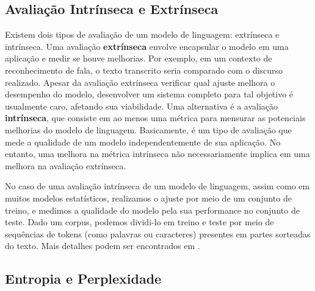\documentclass{automatextcc}
\begin{document}

\subsection{Avaliação Intrínseca e Extrínseca}
Existem dois tipos de avaliação de um modelo de linguagem: extrínseca e intrínseca. Uma avaliação \textbf{extrínseca} envolve encapsular o modelo em uma aplicação e medir se houve melhorias. Por exemplo, em um contexto de reconhecimento de fala, o texto transcrito seria comparado com o discurso realizado. Apesar da avaliação extrínseca verificar qual ajuste melhora o desempenho do modelo, desenvolver um sistema completo para tal objetivo é usualmente caro, afetando sua viabilidade. Uma alternativa é a avaliação \textbf{intrínseca}, que consiste em ao menos uma métrica para mensurar as potenciais melhorias do modelo de linguagem. Basicamente, é um tipo de avaliação que mede a qualidade de um modelo independentemente de sua aplicação. No entanto, uma melhora na métrica intrínseca não necessariamente implica em uma melhora na avaliação extrínseca. 

No caso de uma avaliação intrínseca de um modelo de linguagem, assim como em muitos modelos estatísticos, realizamos o ajuste por meio de um conjunto de treino, e medimos a qualidade do modelo pela sua performance no conjunto de teste. Dado um corpus, podemos dividi-lo em treino e teste por meio de sequências de tokens (como palavras ou caracteres) presentes em partes sorteadas do texto. Mais detalhes podem ser encontrados em \citet{goldberg2017, jurafsky2021}.


\subsection{Entropia e Perplexidade}
\label{entropia e perplexidade}

\end{document}
